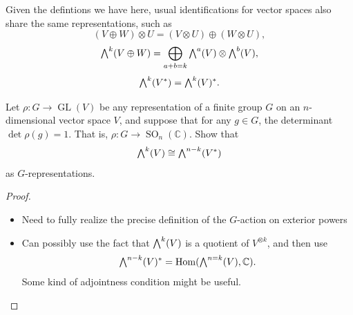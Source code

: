 Given the defintions we have here, usual identifications for vector spaces also share the same representations, such as
\[
	\left( V\oplus W \right) \otimes U=\left( V\otimes U \right) \oplus \left( W\otimes U \right) ,
\]
\[
	\mathbin{\textstyle\bigwedge}^{k}(V\oplus W) =\bigoplus_{a+b=k}\mathbin{\textstyle\bigwedge}^{a}(V) \otimes \mathbin{\textstyle\bigwedge}^{b}(V) 
,\]
\[
	\mathbin{\textstyle\bigwedge}^{k}(V^*) =\mathbin{\textstyle\bigwedge}^{k}(V) ^*
.\]
\begin{exercise}
	Let $\rho : G \to \operatorname{GL} (V)$ be any representation of a finite group $G$ on an $n$-dimensional vector space $V$, and suppose that for any $g\in G$, the determinant $\det \rho (g)=1$. That is, $\rho : G \to \operatorname{SO}_n(\mathbb{C} )$. Show that
	\[
		\mathbin{\textstyle\bigwedge}^{k}(V) \cong \mathbin{\textstyle\bigwedge}^{n-k}(V^*) 
	\]
	as $G$-representations.
\end{exercise}
\begin{proof}
	\begin{itemize}
		\item Need to fully realize the precise definition of the $G$-action on exterior powers
		\item Can possibly use the fact that $\mathbin{\textstyle\bigwedge}^{k}(V) $ is a quotient of $V^{\otimes k} $, and then use
			\[
				\mathbin{\textstyle\bigwedge}^{n-k}(V) ^*=\operatorname{Hom}(\mathbin{\textstyle\bigwedge}^{n=k}(V) , \mathbb{C} ) 
			.\]
			Some kind of adjointness condition might be useful.
	\end{itemize}
\end{proof}

